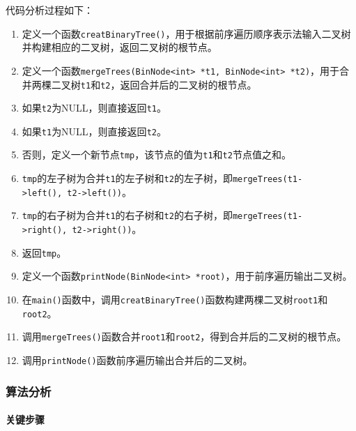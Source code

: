 \documentclass[
]{article}
\begin{document}
代码分析过程如下：

\begin{enumerate}
\def\labelenumi{\arabic{enumi}.}
\item
  定义一个函数\texttt{creatBinaryTree()}，用于根据前序遍历顺序表示法输入二叉树并构建相应的二叉树，返回二叉树的根节点。
\item
  定义一个函数\texttt{mergeTrees(BinNode\textless{}int\textgreater{}\ *t1,\ BinNode\textless{}int\textgreater{}\ *t2)}，用于合并两棵二叉树\texttt{t1}和\texttt{t2}，返回合并后的二叉树的根节点。
\item
  如果\texttt{t2}为NULL，则直接返回\texttt{t1}。
\item
  如果\texttt{t1}为NULL，则直接返回\texttt{t2}。
\item
  否则，定义一个新节点\texttt{tmp}，该节点的值为\texttt{t1}和\texttt{t2}节点值之和。
\item
  \texttt{tmp}的左子树为合并\texttt{t1}的左子树和\texttt{t2}的左子树，即\texttt{mergeTrees(t1-\textgreater{}left(),\ t2-\textgreater{}left())}。
\item
  \texttt{tmp}的右子树为合并\texttt{t1}的右子树和\texttt{t2}的右子树，即\texttt{mergeTrees(t1-\textgreater{}right(),\ t2-\textgreater{}right())}。
\item
  返回\texttt{tmp}。
\item
  定义一个函数\texttt{printNode(BinNode\textless{}int\textgreater{}\ *root)}，用于前序遍历输出二叉树。
\item
  在\texttt{main()}函数中，调用\texttt{creatBinaryTree()}函数构建两棵二叉树\texttt{root1}和\texttt{root2}。
\item
  调用\texttt{mergeTrees()}函数合并\texttt{root1}和\texttt{root2}，得到合并后的二叉树的根节点。
\item
  调用\texttt{printNode()}函数前序遍历输出合并后的二叉树。
\end{enumerate}

\hypertarget{ux7b97ux6cd5ux5206ux6790}{%
\subsubsection{算法分析}\label{ux7b97ux6cd5ux5206ux6790}}

\hypertarget{ux5173ux952eux6b65ux9aa4}{%
\paragraph{关键步骤}\label{ux5173ux952eux6b65ux9aa4}}
\end{document}
